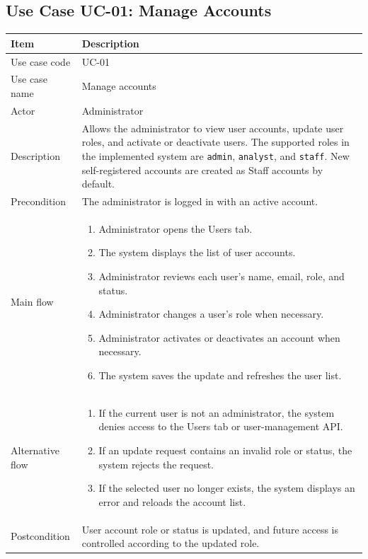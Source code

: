 \documentclass[12pt,a4paper]{report}
\begin{document}
\subsection{Use Case UC-01: Manage Accounts}
\begin{longtable}{|p{3.6cm}|p{10.4cm}|}
\hline
\rowcolor{HeaderBlue}\textbf{Item} & \textbf{Description} \\
\hline
Use case code & UC-01 \\
\hline
Use case name & Manage accounts \\
\hline
Actor & Administrator \\
\hline
Description & Allows the administrator to view user accounts, update user roles, and activate or deactivate users. The supported roles in the implemented system are \texttt{admin}, \texttt{analyst}, and \texttt{staff}. New self-registered accounts are created as Staff accounts by default. \\
\hline
Precondition & The administrator is logged in with an active account. \\
\hline
Main flow &
\begin{enumerate}
    \item Administrator opens the Users tab.
    \item The system displays the list of user accounts.
    \item Administrator reviews each user's name, email, role, and status.
    \item Administrator changes a user's role when necessary.
    \item Administrator activates or deactivates an account when necessary.
    \item The system saves the update and refreshes the user list.
\end{enumerate} \\
\hline
Alternative flow &
\begin{enumerate}
    \item If the current user is not an administrator, the system denies access to the Users tab or user-management API.
    \item If an update request contains an invalid role or status, the system rejects the request.
    \item If the selected user no longer exists, the system displays an error and reloads the account list.
\end{enumerate} \\
\hline
Postcondition & User account role or status is updated, and future access is controlled according to the updated role. \\
\hline
\end{longtable}
\end{document}
